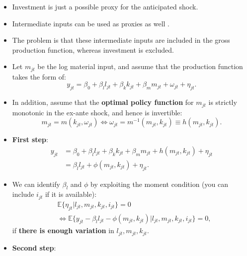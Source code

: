 \documentclass[
]{book}
\begin{document}
\begin{itemize}
\item
  Investment is just a possible proxy for the anticipated shock.
\item
  Intermediate inputs can be used as proxies as well \citep{Levinsohn2003}.
\item
  The problem is that these intermediate inputs are included in the gross production function, whereas investment is excluded.
\item
  Let \(m_{jt}\) be the log material input, and assume that the production function takes the form of:
  \begin{equation}
  y_{jt} = \beta_0 + \beta_l l_{jt} + \beta_k k_{jt} + \beta_m m_{jt} + \omega_{jt} + \eta_{jt}.
  \end{equation}
\item
  In addition, assume that the \textbf{optimal policy function} for \(m_{jt}\) is strictly monotonic in the ex-ante shock, and hence is invertible:
  \begin{equation}
  m_{jt} = m(k_{jt}, \omega_{jt}) \Leftrightarrow \omega_{jt} = m^{-1}(m_{jt}, k_{jt}) \equiv h(m_{jt}, k_{jt}). \label{eq:material}
  \end{equation}
\item
  \textbf{First step}:
  \begin{equation}
  \begin{split}
  y_{jt} &= \beta_0 + \beta_l l_{jt} + \beta_k k_{jt} + \beta_m m_{jt} + h(m_{jt}, k_{jt}) + \eta_{jt}\\
  &= \beta_l l_{jt} + \phi(m_{jt}, k_{jt}) + \eta_{jt}.
  \end{split}
  \end{equation}
\item
  We can identify \(\beta_l\) and \(\phi\) by exploiting the moment condition (you can include \(i_{jt}\) if it is available):
  \begin{equation}
  \begin{split}
  & \mathbb{E}\{\eta_{jt}|l_{jt}, m_{jt}, k_{jt}, i_{jt}\} = 0\\
  & \Leftrightarrow \mathbb{E}\{y_{jt}  - \beta_l l_{jt} - \phi(m_{jt}, k_{jt}) |l_{jt}, m_{jt}, k_{jt}, i_{jt}\} = 0,
  \end{split}
  \end{equation}
  if \textbf{there is enough variation} in \(l_{jt}, m_{jt}, k_{jt}\).
\item
  \textbf{Second step}:
  \begin{equation}
  \begin{split}

\end{split}
\end{equation}
\end{itemize}
\end{document}
